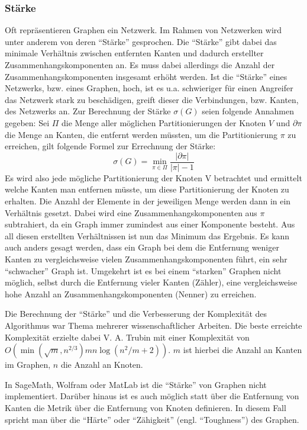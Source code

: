 \documentclass[a4paper,12pt,ngerman,chapterprefix=false,listof=totoc,bibliography=totoc]{scrreprt}
\begin{document}
\subsubsection*{Stärke}
{
Oft repräsentieren Graphen ein Netzwerk. Im Rahmen von Netzwerken wird unter anderem von deren "`Stärke"' gesprochen. Die "`Stärke"' gibt dabei das minimale Verhältnis zwischen entfernten Kanten und dadurch erstellter Zusammenhangskomponenten an. Es muss dabei allerdings die Anzahl der Zusammenhangskomponenten insgesamt erhöht werden. Ist die "`Stärke"' eines Netzwerks, bzw. eines Graphen, hoch, ist es u.a. schwieriger für einen Angreifer das Netzwerk stark zu beschädigen, greift dieser die Verbindungen, bzw. Kanten, des Netzwerks an. Zur Berechnung der Stärke \(\sigma(G)\) seien folgende Annahmen gegeben: Sei \(\Pi\) die Menge aller möglichen Partitionierungen der Knoten \(V\) und \(\partial\pi\) die Menge an Kanten, die entfernt werden müssten, um die Partitionierung \(\pi\) zu erreichen, gilt folgende Formel zur Errechnung der Stärke:
\[\sigma(G)=\min_{\pi\in\Pi}\frac{\vert\partial\pi\vert}{\vert\pi\vert -1}\]
Es wird also jede mögliche Partitionierung der Knoten V betrachtet und ermittelt welche Kanten man entfernen müsste, um diese Partitionierung der Knoten zu erhalten. Die Anzahl der Elemente in der jeweiligen Menge werden dann in ein Verhältnis gesetzt. Dabei wird eine Zusammenhangskomponenten aus \(\pi\) subtrahiert, da ein Graph immer zumindest aus einer Komponente besteht. Aus all diesen erstellten Verhältnissen ist nun das Minimum das Ergebnis. \cite{trubin_strenght_1993,cunningham_optimal_1985} Es kann auch anders gesagt werden, dass ein Graph bei dem die Entfernung weniger Kanten zu vergleichsweise vielen Zusammenhangskomponenten führt, ein sehr "`schwacher"' Graph ist. Umgekehrt ist es bei einem "`starken"' Graphen nicht möglich, selbst durch die Entfernung vieler Kanten (Zähler), eine vergleichsweise hohe Anzahl an Zusammenhangskomponenten (Nenner) zu erreichen.

Die Berechnung der "`Stärke"' und die Verbesserung der Komplexität des Algorithmus war Thema mehrerer wissenschaftlicher Arbeiten. Die beste erreichte Komplexität erzielte dabei V. A. Trubin mit einer Komplexität von \(O(\min(\sqrt{m},n^{2/3})mn\log(n^2/m+2))\). \(m\) ist hierbei die Anzahl an Kanten im Graphen, \(n\) die Anzahl an Knoten. \cite{trubin_strenght_1993}

In SageMath, Wolfram oder MatLab ist die "`Stärke"' von Graphen nicht implementiert. Darüber hinaus ist es auch möglich statt über die Entfernung von Kanten die Metrik über die Entfernung von Knoten definieren. In diesem Fall spricht man über die "`Härte"' oder "`Zähigkeit"' (engl. "`Toughness"') des Graphen. \cite{chvatal_tough_2006}
}
\end{document}
